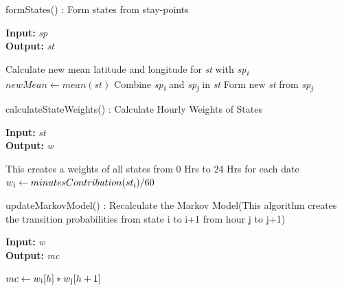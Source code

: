 \documentclass{article}
\begin{document}
\begin{algorithm}
\caption{formStates() : Form states from stay-points}
\label{pseudoPSO}
\hspace*{\algorithmicindent} \textbf{Input:}  \textit{sp} \\
\hspace*{\algorithmicindent} \textbf{Output:}  \textit{st}

\begin{algorithmic}[1]

	\State Calculate new mean latitude and longitude for \textit{st} with \textit{sp\textsubscript{i}}
	\State $newMean \gets mean(\textit{st})$
		\State Combine \textit{sp\textsubscript{i}} and \textit{sp\textsubscript{j}} in \textit{st}
	\Else
		\State Form new \textit{st} from \textit{sp\textsubscript{j}}
	\EndIf
\EndIf
\EndFor
\EndFor
\end{algorithmic}
\end{algorithm}

\begin{algorithm}
\caption{calculateStateWeights() : Calculate Hourly Weights of States}
\label{pseudoPSO}
\hspace*{\algorithmicindent} \textbf{Input:}  \textit{st} \\
\hspace*{\algorithmicindent} \textbf{Output:}  \textit{w}
\begin{algorithmic}[1]
\State This creates a weights of all states from 0 Hrs to 24 Hrs for each date
	\State $w\textsubscript{i} \gets minutesContribution(st\textsubscript{i}) / 60$
\EndFor
\end{algorithmic}
\end{algorithm}


\begin{algorithm}
\caption{updateMarkovModel() : Recalculate the Markov Model(This algorithm creates the transition probabilities from state i to i+1 from hour j to j+1)}
\label{pseudoPSO}
\hspace*{\algorithmicindent} \textbf{Input:}  \textit{w} \\
\hspace*{\algorithmicindent} \textbf{Output:}  \textit{mc}
\begin{algorithmic}[1]
			\State $mc \gets w\textsubscript{i}[h] * w\textsubscript{j}[h+1]$
		\EndFor
	\EndFor
\EndFor
\end{algorithmic}
\end{algorithm}
\end{document}
